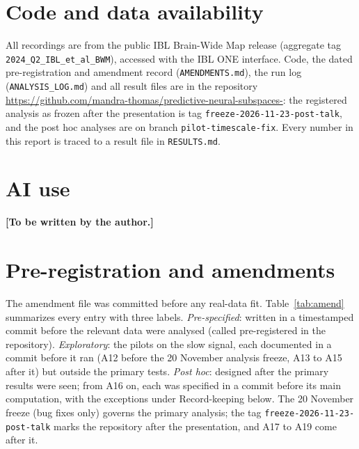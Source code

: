 \documentclass{article}
\begin{document}
\section*{Code and data availability}
All recordings are from the public IBL Brain-Wide Map release \citep{ibl2025bwm} (aggregate tag
\texttt{2024\_Q2\_IBL\_et\_al\_BWM}), accessed with the IBL ONE interface. Code, the dated pre-registration and
amendment record (\texttt{AMENDMENTS.md}), the run log (\texttt{ANALYSIS\_LOG.md}) and all result files are in the
repository \url{https://github.com/mandra-thomas/predictive-neural-subspaces-}: the registered analysis as frozen
after the presentation is tag \texttt{freeze-2026-11-23-post-talk}, and the post hoc analyses are on branch
\texttt{pilot-timescale-fix}. Every number in this report is traced to a result file in \texttt{RESULTS.md}.

\section*{AI use}
\textbf{[To be written by the author.]}





\clearpage
\appendix

\section{Pre-registration and amendments}
\label{app:prereg}

The amendment file was committed before any real-data fit. Table~\ref{tab:amend} summarizes every entry with
three labels. \emph{Pre-specified}: written in a timestamped commit before the relevant data were analysed (called
pre-registered in the repository). \emph{Exploratory}: the pilots on the slow signal, each documented in a commit
before it ran (A12 before the 20 November analysis freeze, A13 to A15 after it) but outside the primary tests.
\emph{Post hoc}: designed after the primary results were seen; from A16 on, each was specified in a commit before
its main computation, with the exceptions under Record-keeping below. The 20 November freeze (bug fixes only) governs
the primary analysis; the tag \texttt{freeze-2026-11-23-post-talk} marks the repository after the presentation, and
A17 to A19 come after it.
\end{document}
